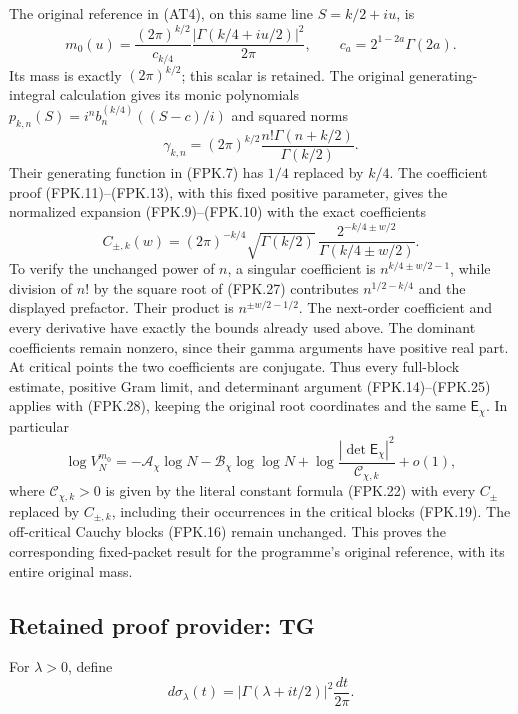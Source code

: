 \documentclass[11pt,a4paper]{article}
\begin{document}
The original reference in (AT4), on this same line $S=k/2+iu$, is
\[
 m_0(u)=\frac{(2\pi)^{k/2}}{c_{k/4}}
           \frac{|\Gamma(k/4+iu/2)|^2}{2\pi},
 \qquad c_a=2^{1-2a}\Gamma(2a).
 \tag{FPK.26}
\]
Its mass is exactly $(2\pi)^{k/2}$; this scalar is retained.
The original generating-integral calculation gives its monic
polynomials $p_{k,n}(S)=i^n b_n^{(k/4)}((S-c)/i)$ and squared norms
\[
 \gamma_{k,n}=(2\pi)^{k/2}
                  \frac{n!\Gamma(n+k/2)}{\Gamma(k/2)}.
 \tag{FPK.27}
\]
Their generating function in (FPK.7) has $1/4$ replaced by $k/4$.
The coefficient proof (FPK.11)--(FPK.13), with this fixed positive
parameter, gives the normalized expansion (FPK.9)--(FPK.10) with
the exact coefficients
\[
 C_{\pm,k}(w)=
 (2\pi)^{-k/4}\sqrt{\Gamma(k/2)}\,
          \frac{2^{-k/4\pm w/2}}{\Gamma(k/4\pm w/2)}.
 \tag{FPK.28}
\]
To verify the unchanged power of $n$, a singular coefficient is
$n^{k/4\pm w/2-1}$, while division of $n!$ by the square root
of (FPK.27) contributes $n^{1/2-k/4}$ and the displayed prefactor.
Their product is $n^{\pm w/2-1/2}$. The next-order coefficient
and every derivative have exactly the bounds already used above.
The dominant coefficients remain nonzero, since their gamma
arguments have positive real part. At critical points the two
coefficients are conjugate. Thus every full-block estimate,
positive Gram limit, and determinant argument (FPK.14)--(FPK.25)
applies with (FPK.28), keeping the original root coordinates and
the same $\mathsf E_\chi$. In particular
\[
 \log V_N^{m_0}
   =-\mathcal A_\chi\log N-\mathcal B_\chi\log\log N
       +\log\frac{|\det\mathsf E_\chi|^2}{\mathcal C_{\chi,k}}+o(1),
 \tag{FPK.29}
\]
where $\mathcal C_{\chi,k}>0$ is given by the literal constant
formula (FPK.22) with every $C_\pm$ replaced by $C_{\pm,k}$,
including their occurrences in the critical blocks (FPK.19).
The off-critical Cauchy blocks (FPK.16) remain unchanged.
This proves the corresponding fixed-packet result for the
programme's original reference, with its entire original mass.


\clearpage
\subsection*{Retained proof provider: TG}

For \(\lambda>0\), define
\[
 d\sigma_\lambda(t)=|\Gamma(\lambda+it/2)|^2\frac{dt}{2\pi}.
                                                               \tag{TG.3}
\]
\end{document}
